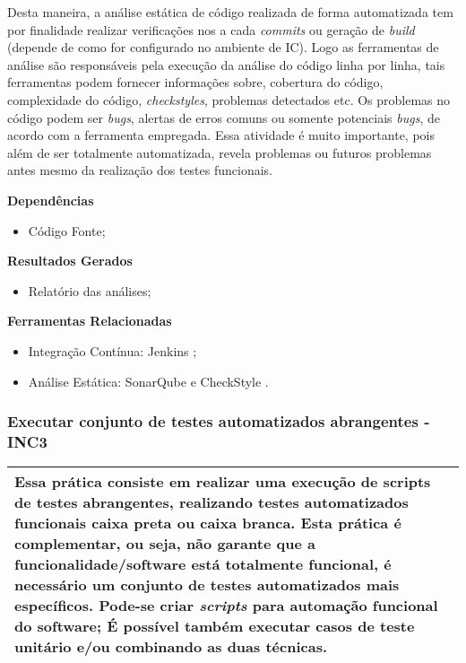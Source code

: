 Desta maneira, a análise estática de código realizada de forma automatizada tem por finalidade realizar verificações nos a cada \textit{commits} ou geração de \textit{build} (depende de como for configurado no ambiente de IC). Logo as ferramentas de análise são responsáveis pela execução da análise do código linha por linha, tais ferramentas podem fornecer informações sobre, cobertura do código, complexidade do código, \textit{checkstyles}, problemas detectados etc. Os problemas no código podem ser \textit{bugs}, alertas de erros comuns ou somente potenciais \textit{bugs}, de acordo com a ferramenta empregada. Essa atividade é muito importante, pois além de ser totalmente automatizada, revela problemas ou futuros problemas antes mesmo da realização dos testes funcionais.

\textbf{Dependências}
\begin{itemize}
    \item Código Fonte;
\end{itemize}

\textbf{ Resultados Gerados}
\begin{itemize}
    \item Relatório das análises;
\end{itemize}

\textbf{Ferramentas Relacionadas}
\begin{itemize}
    \item Integração Contínua: Jenkins \cite{Jenkins};
    \item Análise Estática: SonarQube \cite{SonarQube} e CheckStyle \cite{CheckStyle}.
\end{itemize}

\subsubsection{Executar conjunto de testes automatizados abrangentes - INC3}
\label{sec:inc3}

\begin{table}[H]
\centering
\begin{tabular}{|p{130mm}|}
\hline
Essa prática consiste em realizar uma execução de scripts de testes abrangentes, realizando testes automatizados funcionais caixa preta ou caixa branca. Esta prática é complementar, ou seja, não garante que a funcionalidade/software está totalmente funcional, é necessário um conjunto de testes automatizados mais específicos. Pode-se criar \textit{scripts} para automação funcional do software; É possível também executar casos de teste unitário e/ou combinando as duas técnicas. \\ 
\hline
\end{tabular}
\end{table}

